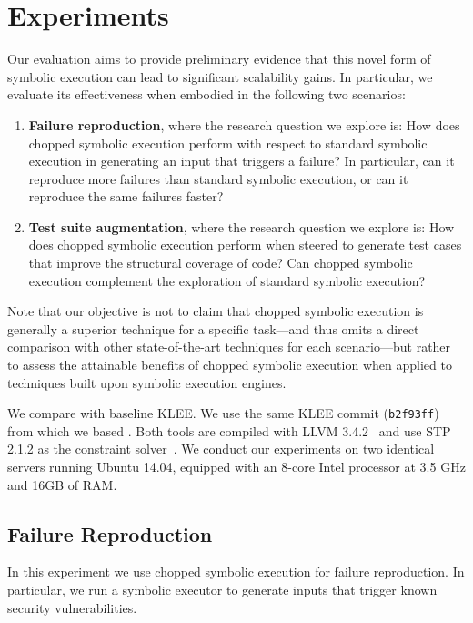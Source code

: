 
\chapter{Experiments}\label{chapter:experiments}

Our evaluation aims to provide preliminary evidence that this novel
form of symbolic execution can lead to significant scalability
gains. In particular, we evaluate its effectiveness when embodied in
the following two scenarios:

\begin{enumerate}[leftmargin=*]
\item \textbf{Failure reproduction}, where the research question we
  explore is: How does chopped symbolic execution perform with respect
  to standard symbolic execution in generating an input that triggers
  a failure? In particular, can it reproduce more failures than standard
  symbolic execution, or can it reproduce the same failures faster?

\item \textbf{Test suite augmentation}, where the research question we
  explore is: How does chopped symbolic execution perform when steered
  to generate test cases that improve the structural coverage of code?
  Can chopped symbolic execution complement the exploration of
  standard symbolic execution?
\end{enumerate}

Note that our objective is not to claim that chopped symbolic
execution is generally a superior technique for a specific task---and
thus omits a direct comparison with other state-of-the-art techniques
for each scenario---but rather to assess the attainable benefits of
chopped symbolic execution when applied to techniques built upon
symbolic execution engines.

We compare \toolname with baseline KLEE. We use the same KLEE commit
(\texttt{b2f93ff}) from which we based \toolname.  Both tools are
compiled with LLVM 3.4.2~\cite{llvm} and use STP 2.1.2 as the
constraint solver~\cite{stp}. We conduct our experiments on two
identical servers running Ubuntu 14.04, equipped with an 8-core Intel
processor at 3.5 GHz and 16GB of RAM.

\section{Failure Reproduction}
\label{sec:disc-secur-vuln}
In this experiment we use chopped symbolic execution for failure
reproduction. In particular, we run a symbolic executor to generate
inputs that trigger known security vulnerabilities.

